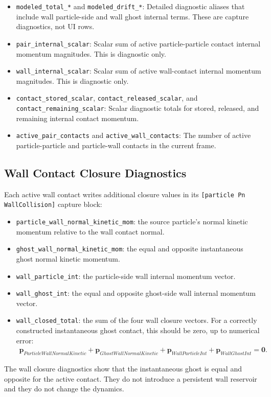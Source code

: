 \begin{itemize}
\item \texttt{modeled\_total\_*} and \texttt{modeled\_drift\_*}: Detailed
diagnostic aliases that include wall particle-side and wall ghost internal
terms.  These are capture diagnostics, not UI rows.

\item \texttt{pair\_internal\_scalar}: Scalar sum of active particle-particle
contact internal momentum magnitudes.  This is diagnostic only.

\item \texttt{wall\_internal\_scalar}: Scalar sum of active wall-contact
internal momentum magnitudes.  This is diagnostic only.

\item \texttt{contact\_stored\_scalar},
\texttt{contact\_released\_scalar}, and
\texttt{contact\_remaining\_scalar}: Scalar diagnostic totals for stored,
released, and remaining internal contact momentum.

\item \texttt{active\_pair\_contacts} and \texttt{active\_wall\_contacts}: The
number of active particle-particle and particle-wall contacts in the current
frame.
\end{itemize}

\subsection{Wall Contact Closure Diagnostics}

Each active wall contact writes additional closure values in its
\texttt{[particle Pn WallCollision]} capture block:

\begin{itemize}
\item \texttt{particle\_wall\_normal\_kinetic\_mom}: the source particle's
normal kinetic momentum relative to the wall contact normal.

\item \texttt{ghost\_wall\_normal\_kinetic\_mom}: the equal and opposite
instantaneous ghost normal kinetic momentum.

\item \texttt{wall\_particle\_int}: the particle-side wall internal momentum
vector.

\item \texttt{wall\_ghost\_int}: the equal and opposite ghost-side wall
internal momentum vector.

\item \texttt{wall\_closed\_total}: the sum of the four wall closure vectors.
For a correctly constructed instantaneous ghost contact, this should be zero,
up to numerical error:
\begin{equation}
\begin{aligned}
\mathbf{p}_{ParticleWallNormalKinetic}
+
\mathbf{p}_{GhostWallNormalKinetic}
+
\mathbf{p}_{WallParticleInt}
+
\mathbf{p}_{WallGhostInt}
=
\mathbf{0}.
\end{aligned}
\end{equation}
\end{itemize}

The wall closure diagnostics show that the instantaneous ghost is equal and
opposite for the active contact.  They do not introduce a persistent wall
reservoir and they do not change the dynamics.
